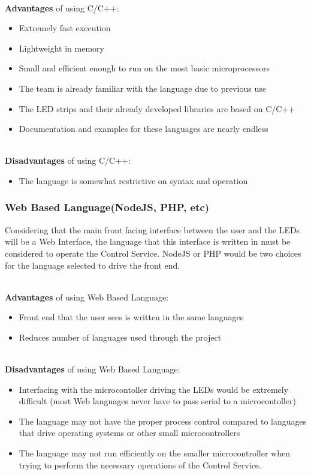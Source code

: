 \documentclass[onecolumn, draftclsnofoot,10pt, compsoc]{IEEEtran}
\begin{document}
			\noindent \\ \textbf{Advantages} of using C/C++:
			\begin{itemize}
				\item Extremely fast execution
				\item Lightweight in memory
				\item Small and efficient enough to run on the most basic microprocessors
				\item The team is already familiar with the language due to previous use
				\item The LED strips and their already developed libraries are based on C/C++
				\item Documentation and examples for these languages are nearly endless
			\end{itemize}

			\noindent \\ \textbf{Disadvantages} of using C/C++:
			\begin{itemize}
				\item The language is somewhat restrictive on syntax and operation
			\end{itemize}


			\subsubsection{Web Based Language(NodeJS, PHP, etc)}
			Considering that the main front facing interface between the user and the LEDs will be a Web Interface, the language that this interface is written in must be considered to operate
			the Control Service.  NodeJS or PHP would be two choices for the language selected to drive the front end.

			\noindent \\ \textbf{Advantages} of using Web Based Language:
			\begin{itemize}
				\item Front end that the user sees is written in the same languages
				\item Reduces number of languages used through the project
			\end{itemize}

			\noindent \\ \textbf{Disadvantages} of using Web Based Language:
			\begin{itemize}
				\item Interfacing with the microcontoller driving the LEDs would be extremely difficult (most Web languages never have to pass serial to a microcontoller)
				\item The language may not have the proper process control compared to languages that drive operating systems or other small microcontrollers
				\item The language may not run efficiently on the smaller microcontroller when trying to perform the necessary operations of the Control Service.
			\end{itemize}
\end{document}
